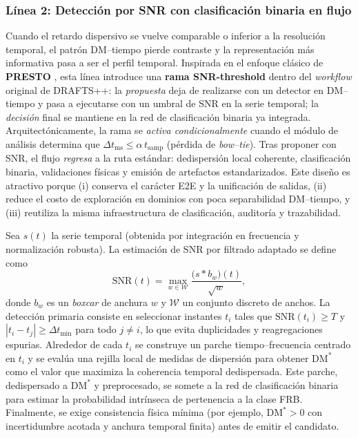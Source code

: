 \subsubsection{Línea 2: Detección por SNR con clasificación binaria en flujo}

Cuando el retardo dispersivo se vuelve comparable o inferior a la resolución temporal, el patrón DM–tiempo pierde contraste y la representación más informativa pasa a ser el perfil temporal. Inspirada en el enfoque clásico de \textbf{PRESTO} \cite{Ransom_PRESTO_Tutorial}, esta línea introduce una \textbf{rama SNR-threshold} dentro del \emph{workflow} original de DRAFTS++: la \textit{propuesta} deja de realizarse con un detector en DM–tiempo y pasa a ejecutarse con un umbral de SNR en la serie temporal; la \textit{decisión} final se mantiene en la red de clasificación binaria ya integrada. Arquitectónicamente, la rama se \textit{activa condicionalmente} cuando el módulo de análisis determina que $\Delta t_{\mathrm{ms}} \le \alpha\, t_{\mathrm{samp}}$ (pérdida de \textit{bow–tie}). Tras proponer con SNR, el flujo \textit{regresa} a la ruta estándar: dedispersión local coherente, clasificación binaria, validaciones físicas y emisión de artefactos estandarizados. Este diseño es atractivo porque (i) conserva el carácter E2E y la unificación de salidas, (ii) reduce el costo de exploración en dominios con poca separabilidad DM–tiempo, y (iii) reutiliza la misma infraestructura de clasificación, auditoría y trazabilidad.

Sea $s(t)$ la serie temporal (obtenida por integración en frecuencia y normalización robusta). La estimación de SNR por filtrado adaptado se define como
\[
\mathrm{SNR}(t) = \max_{w\in\mathcal{W}} \frac{\big(s * b_w\big)(t)}{\sqrt{w}},
\]
donde $b_w$ es un \textit{boxcar} de anchura $w$ y $\mathcal{W}$ un conjunto discreto de anchos. La detección primaria consiste en seleccionar instantes $t_i$ tales que $\mathrm{SNR}(t_i)\ge T$ y $|t_i-t_j|\ge \Delta t_{\min}$ para todo $j\ne i$, lo que evita duplicidades y reagregaciones espurias. Alrededor de cada $t_i$ se construye un parche tiempo–frecuencia centrado en $t_i$ y se evalúa una rejilla local de medidas de dispersión para obtener $\mathrm{DM}^*$ como el valor que maximiza la coherencia temporal dedispersada. Este parche, dedispersado a $\mathrm{DM}^*$ y preprocesado, se somete a la red de clasificación binaria para estimar la probabilidad intrínseca de pertenencia a la clase FRB. Finalmente, se exige consistencia física mínima (por ejemplo, $\mathrm{DM}^*>0$ con incertidumbre acotada y anchura temporal finita) antes de emitir el candidato.


